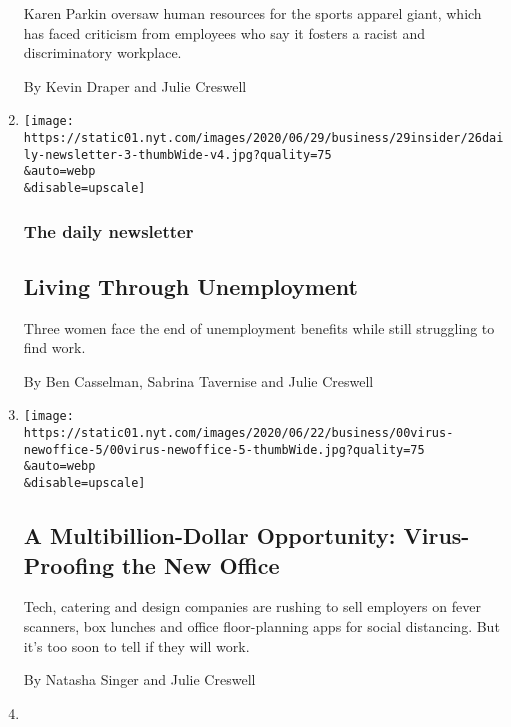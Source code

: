 \begin{enumerate}
  Karen Parkin oversaw human resources for the sports apparel giant,
  which has faced criticism from employees who say it fosters a racist
  and discriminatory workplace.

  By Kevin Draper and Julie Creswell
\item
  \href{/2020/06/26/podcasts/daily-newsletter-unemployment-virus-education.html}{}

  \texttt{[image: https://static01.nyt.com/images/2020/06/29/business/29insider/26daily-newsletter-3-thumbWide-v4.jpg?quality=75\\\&auto=webp\\\&disable=upscale]}

  \hypertarget{the-daily-newsletter}{%
  \subsubsection{The daily newsletter}\label{the-daily-newsletter}}

  \hypertarget{living-through-unemployment}{%
  \subsection{Living Through
  Unemployment}\label{living-through-unemployment}}

  Three women face the end of unemployment benefits while still
  struggling to find work.

  By Ben Casselman, Sabrina Tavernise and Julie Creswell
\item
  \href{/2020/06/22/business/virus-office-workplace-return.html}{}

  \texttt{[image: https://static01.nyt.com/images/2020/06/22/business/00virus-newoffice-5/00virus-newoffice-5-thumbWide.jpg?quality=75\\\&auto=webp\\\&disable=upscale]}

  \hypertarget{a-multibillion-dollar-opportunity-virus-proofing-the-new-office}{%
  \subsection{A Multibillion-Dollar Opportunity: Virus-Proofing the New
  Office}\label{a-multibillion-dollar-opportunity-virus-proofing-the-new-office}}

  Tech, catering and design companies are rushing to sell employers on
  fever scanners, box lunches and office floor-planning apps for social
  distancing. But it's too soon to tell if they will work.

  By Natasha Singer and Julie Creswell
\item
  \href{/2020/06/10/business/adidas-black-employees-discrimination.html}{}


\end{enumerate}

